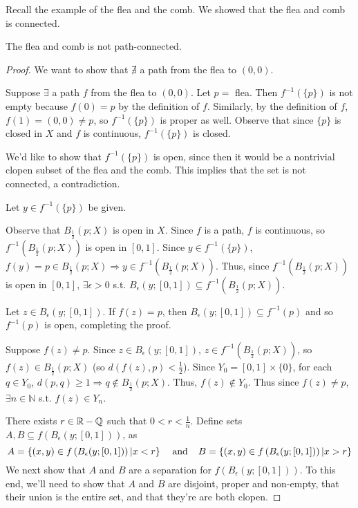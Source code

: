 Recall the example of the flea and the comb. We showed that the flea and comb is connected. 
\begin{theorem}
The flea and comb is not path-connected. 
\end{theorem}
\begin{proof}
We want to show that $\nexists$ a path from the flea to $(0,0)$. 

Suppose $\exists$ a path $f$ from the flea to $(0,0)$. Let $p =$ flea. Then $f^{-1}(\{p\})$ is not empty because $f(0) = p$ by the definition of $f$. Similarly, by the definition of $f$, $f(1) = (0,0) \neq p$, so $f^{-1}(\{p\})$ is proper as well. Observe that since $\{p\}$ is closed in $X$ and $f$ is continuous, $f^{-1}(\{p\})$ is closed.

We'd like to show that $f^{-1}(\{p\})$ is open, since then it would be a nontrivial clopen subset of the flea and the comb. This implies that the set is not connected, a contradiction.

Let $y \in f^{-1}(\{p\})$ be given. 

Observe that $B_{\frac{1}{2}}(p; X)$ is open in $X$. Since $f$ is a path, $f$ is continuous, so $f^{-1}(B_{\frac{1}{2}}(p; X))$ is open in $[0,1]$. Since $y \in f^{-1}(\{p\})$, $f(y) = p \in B_{\frac{1}{2}}(p; X) \Rightarrow y \in f^{-1}(B_{\frac{1}{2}}(p; X))$. Thus, since $f^{-1}(B_{\frac{1}{2}}(p; X))$ is open in $[0,1]$, $\exists \epsilon > 0$ s.t. $B_{\epsilon}(y; [0,1]) \subseteq f^{-1}(B_{\frac{1}{2}}(p; X))$.

Let $z \in B_{\epsilon}(y; [0,1])$. If $f(z) = p$, then $B_{\epsilon}(y; [0,1]) \subseteq f^{-1}(p)$ and so $f^{-1}(p)$ is open, completing the proof.

Suppose $f(z) \neq p$. Since $z \in B_{\epsilon}(y; [0,1])$, $z \in f^{-1}(B_{\frac{1}{2}}(p; X))$, so $f(z) \in B_{\frac{1}{2}}(p; X)$ (so $d(f(z), p) < \frac{1}{2}$). Since $Y_0 = [0,1] \times \{0\}$, for each $q \in Y_0$, $d(p,q) \geq 1 \Rightarrow q \not\in B_{\frac{1}{2}}(p; X)$. Thus, $f(z) \not\in Y_0$. Thus since $f(z) \neq p$, $\exists n \in \mathbb{N}$ s.t. $f(z) \in Y_n$.

There exists $r\in \mathbb R-\mathbb Q$ such that $0 < r < \frac{1}{n}$. Define sets $A, B\subseteq f\left( B_{\epsilon} (y;[0,1]) \right)$, as
\[A = \left\{ (x,y)\in f\left( B_{\epsilon} (y;[0,1]) \right) | x< r\right\} \hspace{.15in} \text{and} \hspace{.15in} B = \left\{ (x,y)\in f\left( B_{\epsilon} (y;[0,1]) \right) | x> r\right\}\]
We next show that $A$ and $B$ are a separation for $f\left( B_{\epsilon} (y;[0,1]) \right)$. To this end, we'll need to show that $A$ and $B$ are disjoint, proper and non-empty, that their union is the entire set, and that they're are both clopen.


\end{proof}
